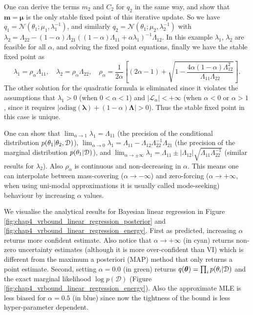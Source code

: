 One can derive the terms $m_2$ and $C_2$ for $q_2$ in the same way, and show that $\bm{m} = \bm{\mu}$ is the only stable fixed point of this iterative update. So we have $q_1 = \mathcal{N}(\theta_1; \mu_1, \lambda_1^{-1})$, and similarly $q_2 = \mathcal{N}(\theta_1; \mu_2, \lambda_2^{-1})$ with $\lambda_2 = \Lambda_{22} - (1 - \alpha) \Lambda_{21} ((1 - \alpha) \Lambda_{11} + \alpha \lambda_1)^{-1} \Lambda_{12}$. In this example $\lambda_1$, $\lambda_2$ are feasible for all $\alpha$, and solving the fixed point equations, finally we have the stable fixed point as
\begin{equation*}
\lambda_1 = \rho_{\alpha} \Lambda_{11}, \quad \lambda_2 = \rho_{\alpha} \Lambda_{22}, \quad 
\rho_{\alpha} = \frac{1}{2 \alpha} \left[ (2\alpha - 1) + \sqrt{1 - \frac{4\alpha (1 - \alpha) \Lambda_{12}^2}{\Lambda_{11} \Lambda_{22}}} \right].
\end{equation*}
The other solution for the quadratic formula is eliminated since it violates the assumptions that $\lambda_1 > 0$ (when $0 < \alpha < 1$) and $|\mathcal{L}_{\alpha}| < +\infty$ (when $\alpha < 0$ or $\alpha > 1$, since it requires $|\alpha \text{diag}(\bm{\lambda}) + (1 - \alpha)\bm{\Lambda}| > 0$). Thus the stable fixed point in this case is unique.

One can show that $\lim_{\alpha \rightarrow 1} \lambda_1 = \Lambda_{11}$ (the precision of the conditional distribution $p(\theta_1 | \theta_2, \mathcal{D})$), $\lim_{\alpha \rightarrow 0} \lambda_1 = \Lambda_{11} - \Lambda_{12} \Lambda_{22}^{-1} \Lambda_{21}$ (the precision of the marginal distribution $p(\theta_1|\mathcal{D})$), and $\lim_{\alpha \rightarrow \pm \infty} \lambda_1 = \Lambda_{11} \pm |\Lambda_{12}| \sqrt{\Lambda_{11} \Lambda_{22}^{-1}}$ (similar results for $\lambda_2$). Also $\rho_{\alpha}$ is continuous and non-decreasing in $\alpha$. This means one can interpolate between mass-covering ($\alpha \rightarrow -\infty$) and zero-forcing ($\alpha \rightarrow +\infty$, when using uni-modal approximations it is usually called mode-seeking) behaviour by increasing $\alpha$ values. 

We visualise the analytical results for Bayesian linear regression in Figure \ref{fig:chap4_vrbound_linear_regression_posterior} and  \ref{fig:chap4_vrbound_linear_regression_energy}. First as predicted, increasing $\alpha$ returns more confident estimate. Also notice that $\alpha \rightarrow +\infty$ (in cyan) returns non-zero uncertainty estimates (although it is more over-confident than VI) which is different from the maximum a posteriori (MAP) method that only returns a point estimate. Second, setting $\alpha = 0.0$ (in green) returns $q(\bm{\theta}) = \prod_i p(\theta_i|\mathcal{D})$ and the exact marginal likelihood $\log p(\mathcal{D})$ (Figure \ref{fig:chap4_vrbound_linear_regression_energy}). Also the approximate MLE is less biased for $\alpha = 0.5$ (in blue) since now the tightness of the bound is less hyper-parameter dependent.

